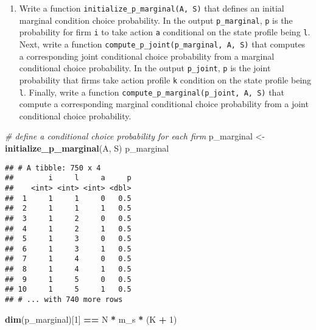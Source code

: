 \documentclass[
]{book}
\newenvironment{Shaded}{\begin{snugshade}}{\end{snugshade}}
\newcommand{\CommentTok}[1]{\textcolor[rgb]{0.56,0.35,0.01}{\textit{#1}}}
\newcommand{\DecValTok}[1]{\textcolor[rgb]{0.00,0.00,0.81}{#1}}
\newcommand{\KeywordTok}[1]{\textcolor[rgb]{0.13,0.29,0.53}{\textbf{#1}}}
\newcommand{\NormalTok}[1]{#1}
\newcommand{\OperatorTok}[1]{\textcolor[rgb]{0.81,0.36,0.00}{\textbf{#1}}}
\newcommand{\StringTok}[1]{\textcolor[rgb]{0.31,0.60,0.02}{#1}}
\providecommand{\tightlist}{%
  \setlength{\itemsep}{0pt}\setlength{\parskip}{0pt}}
\begin{document}
\begin{enumerate}
\def\labelenumi{\arabic{enumi}.}
\setcounter{enumi}{4}
\tightlist
\item
  Write a function \texttt{initialize\_p\_marginal(A,\ S)} that defines an initial marginal condition choice probability. In the output \texttt{p\_marginal}, \texttt{p} is the probability for firm \texttt{i} to take action \texttt{a} conditional on the state profile being \texttt{l}. Next, write a function \texttt{compute\_p\_joint(p\_marginal,\ A,\ S)} that computes a corresponding joint conditional choice probability from a marginal conditional choice probability. In the output \texttt{p\_joint}, \texttt{p} is the joint probability that firms take action profile \texttt{k} condition on the state profile being \texttt{l}. Finally, write a function \texttt{compute\_p\_marginal(p\_joint,\ A,\ S)} that compute a corresponding marginal conditional choice probability from a joint conditional choice probability.
\end{enumerate}

\begin{Shaded}
\begin{Highlighting}[]
\CommentTok{# define a conditional choice probability for each firm}
\NormalTok{p_marginal <-}\StringTok{ }\KeywordTok{initialize_p_marginal}\NormalTok{(A, S)}
\NormalTok{p_marginal}
\end{Highlighting}
\end{Shaded}

\begin{verbatim}
## # A tibble: 750 x 4
##        i     l     a     p
##    <int> <int> <int> <dbl>
##  1     1     1     0   0.5
##  2     1     1     1   0.5
##  3     1     2     0   0.5
##  4     1     2     1   0.5
##  5     1     3     0   0.5
##  6     1     3     1   0.5
##  7     1     4     0   0.5
##  8     1     4     1   0.5
##  9     1     5     0   0.5
## 10     1     5     1   0.5
## # ... with 740 more rows
\end{verbatim}

\begin{Shaded}
\begin{Highlighting}[]
\KeywordTok{dim}\NormalTok{(p_marginal)[}\DecValTok{1}\NormalTok{] }\OperatorTok{==}\StringTok{ }\NormalTok{N }\OperatorTok{*}\StringTok{ }\NormalTok{m_s }\OperatorTok{*}\StringTok{ }\NormalTok{(K }\OperatorTok{+}\StringTok{ }\DecValTok{1}\NormalTok{)}
\end{Highlighting}
\end{Shaded}
\end{document}
